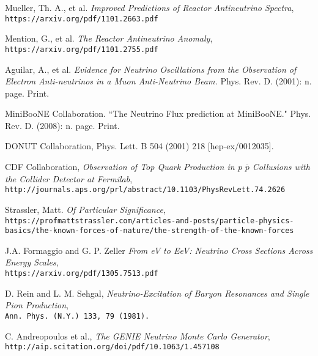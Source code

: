 \begin{thebibliography}{20}
Mueller, Th. A., et al. \emph{Improved Predictions of Reactor Antineutrino Spectra},\\
  \texttt{https://arxiv.org/pdf/1101.2663.pdf}

Mention, G., et al. \emph{The Reactor Antineutrino Anomaly},\\
  \texttt{https://arxiv.org/pdf/1101.2755.pdf}

Aguilar, A., et al. \emph{Evidence for Neutrino Oscillations from the Observation of Electron Anti-neutrinos in a Muon Anti-Neutrino Beam.} Phys. Rev. D. (2001): n. page. Print.

MiniBooNE Collaboration. ``The Neutrino Flux prediction at MiniBooNE." Phys. Rev. D. (2008): n. page. Print.


DONUT Collaboration, Phys. Lett. B 504 (2001) 218 [hep-ex/0012035].

CDF Collaboration, \emph{Observation of Top Quark Production in p $\overline{p}$ Collusions with the Collider Detector at Fermilab},\\
  \texttt{http://journals.aps.org/prl/abstract/10.1103/PhysRevLett.74.2626}


Strassler, Matt. \emph{Of Particular Significance},\\
  \texttt{https://profmattstrassler.com/articles-and-posts/particle-physics-basics/the-known-forces-of-nature/the-strength-of-the-known-forces}

J.A. Formaggio and G. P. Zeller \emph{From eV to EeV: Neutrino Cross Sections Across Energy Scales},\\
\texttt{https://arxiv.org/pdf/1305.7513.pdf}

D. Rein and L. M. Sehgal, \emph{Neutrino-Excitation of Baryon Resonances and Single Pion Production},\\
\texttt{Ann. Phys. (N.Y.) 133, 79 (1981).}


  C. Andreopoulos et al., \emph{The GENIE Neutrino Monte Carlo Generator}, \\
  \texttt{http://aip.scitation.org/doi/pdf/10.1063/1.457108}



\end{thebibliography}
